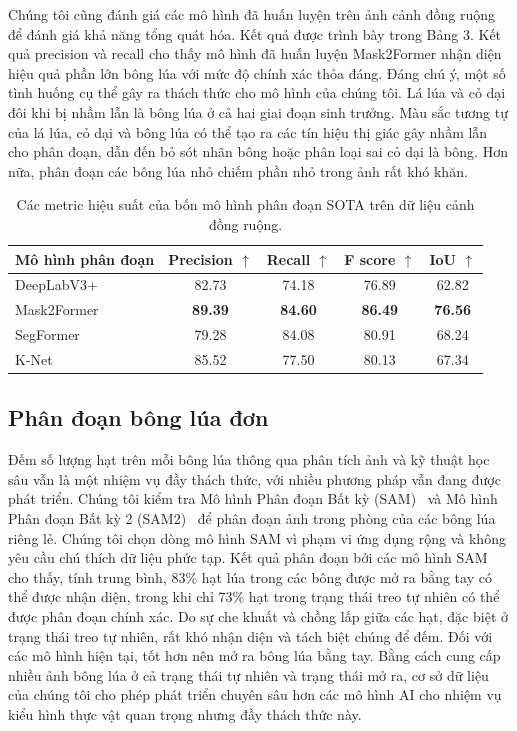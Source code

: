 \documentclass[12pt, a4paper]{article}
\begin{document}
Chúng tôi cũng đánh giá các mô hình đã huấn luyện trên ảnh cảnh đồng ruộng để đánh giá khả
năng tổng quát hóa. Kết quả được trình bày trong Bảng 3. Kết quả precision và recall cho thấy
mô hình đã huấn luyện Mask2Former nhận diện hiệu quả phần lớn bông lúa với mức độ chính xác
thỏa đáng. Đáng chú ý, một số tình huống cụ thể gây ra thách thức cho mô hình của chúng tôi.
Lá lúa và cỏ dại đôi khi bị nhầm lẫn là bông lúa ở cả hai giai đoạn sinh trưởng. Màu sắc
tương tự của lá lúa, cỏ dại và bông lúa có thể tạo ra các tín hiệu thị giác gây nhầm lẫn
cho phân đoạn, dẫn đến bỏ sót nhãn bông hoặc phân loại sai cỏ dại là bông. Hơn nữa, phân
đoạn các bông lúa nhỏ chiếm phần nhỏ trong ảnh rất khó khăn.

\begin{table}[ht]
  \centering
  \caption{Các metric hiệu suất của bốn mô hình phân đoạn SOTA trên dữ liệu cảnh đồng ruộng.}
  \label{tab:field_results}
  \begin{tabular}{lcccc}
    \toprule
    \textbf{Mô hình phân đoạn} & \textbf{Precision $\uparrow$} & \textbf{Recall $\uparrow$} & \textbf{F score $\uparrow$} & \textbf{IoU $\uparrow$} \\
    \midrule
    DeepLabV3+ & 82.73 & 74.18 & 76.89 & 62.82 \\
    Mask2Former & \textbf{89.39} & \textbf{84.60} & \textbf{86.49} & \textbf{76.56} \\
    SegFormer   & 79.28 & 84.08 & 80.91 & 68.24 \\
    K-Net       & 85.52 & 77.50 & 80.13 & 67.34 \\
    \bottomrule
  \end{tabular}
\end{table}

\subsection{Phân đoạn bông lúa đơn}

Đếm số lượng hạt trên mỗi bông lúa thông qua phân tích ảnh và kỹ thuật học sâu vẫn là một
nhiệm vụ đầy thách thức, với nhiều phương pháp vẫn đang được phát triển. Chúng tôi kiểm tra
Mô hình Phân đoạn Bất kỳ (SAM)~\cite{kirillov2023} và Mô hình Phân đoạn Bất kỳ 2
(SAM2)~\cite{ravi2024} để phân đoạn ảnh trong phòng của các bông lúa riêng lẻ. Chúng tôi
chọn dòng mô hình SAM vì phạm vi ứng dụng rộng và không yêu cầu chú thích dữ liệu phức tạp.
Kết quả phân đoạn bởi các mô hình SAM cho thấy, tính trung bình, 83\% hạt lúa trong các bông
được mở ra bằng tay có thể được nhận diện, trong khi chỉ 73\% hạt trong trạng thái treo tự
nhiên có thể được phân đoạn chính xác. Do sự che khuất và chồng lấp giữa các hạt, đặc biệt
ở trạng thái treo tự nhiên, rất khó nhận diện và tách biệt chúng để đếm. Đối với các mô hình
hiện tại, tốt hơn nên mở ra bông lúa bằng tay. Bằng cách cung cấp nhiều ảnh bông lúa ở cả
trạng thái tự nhiên và trạng thái mở ra, cơ sở dữ liệu của chúng tôi cho phép phát triển
chuyên sâu hơn các mô hình AI cho nhiệm vụ kiểu hình thực vật quan trọng nhưng đầy thách
thức này.
\end{document}
